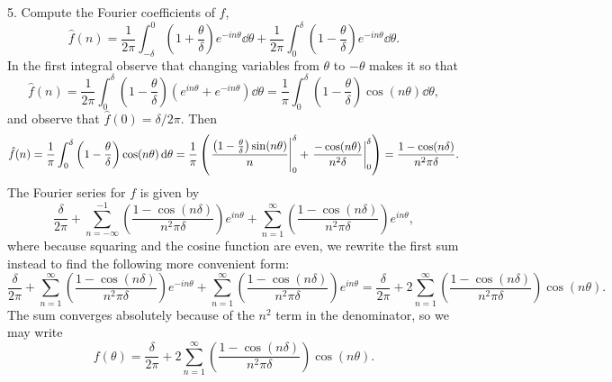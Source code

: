 \documentclass[11pt]{article}
\newcommand{\br}[1]{\left(#1\right)}
\begin{document}
5. Compute the Fourier coefficients of $f$, \[\hat{f}(n) = \frac{1}{2\pi}\int_{-\delta}^{0}\br{1+\frac{\theta}{\delta}}e^{-in\theta}\dd{\theta} + \frac{1}{2\pi}\int_{0}^{\delta}\br{1-\frac{\theta}{\delta}}e^{-in\theta}\dd{\theta}.\] In the first integral observe that changing variables from $\theta$ to $-\theta$ makes it so that \[\hat{f}(n) = \frac{1}{2\pi}\int_0^{\delta}\br{1-\frac{\theta}{\delta}}\br{e^{in\theta} + e^{-in\theta}}\dd{\theta} = \frac{1}{\pi}\int_0^{\delta}\br{1-\frac{\theta}{\delta}}\cos(n\theta)\dd{\theta},\] and observe that $\hat{f}(0) = \delta/2\pi$. Then \[\hat{f}(n) = \frac{1}{\pi}\int_0^{\delta}\br{1-\frac{\theta}{\delta}}\cos(n\theta)\dd{\theta} = \frac{1}{\pi} \br{ \eval{\frac{\br{1-\frac{\theta}{\delta}}\sin(n\theta)}{n}}_0^{\delta} + \eval{\frac{-\cos(n\theta)}{n^2\delta}}_0^{\delta} } = \frac{1-\cos(n\delta)}{n^2\pi\delta}.\] The Fourier series for $f$ is given by \[\frac{\delta}{2\pi} + \sum_{n=-\infty}^{-1} \br{\frac{1-\cos(n\delta)}{n^2\pi\delta}}e^{in\theta} + \sum_{n=1}^{\infty} \br{\frac{1-\cos(n\delta)}{n^2\pi\delta}}e^{in\theta},\] where because squaring and the cosine function are even, we rewrite the first sum instead to find the following more convenient form: \[\frac{\delta}{2\pi} + \sum_{n=1}^{\infty} \br{\frac{1-\cos(n\delta)}{n^2\pi\delta}}e^{-in\theta} + \sum_{n=1}^{\infty} \br{\frac{1-\cos(n\delta)}{n^2\pi\delta}}e^{in\theta} = \frac{\delta}{2\pi} + 2\sum_{n=1}^{\infty} \br{\frac{1-\cos(n\delta)}{n^2\pi\delta}}\cos(n\theta).\] The sum converges absolutely because of the $n^2$ term in the denominator, so we may write \[f(\theta) = \frac{\delta}{2\pi} + 2\sum_{n=1}^{\infty} \br{\frac{1-\cos(n\delta)}{n^2\pi\delta}}\cos(n\theta).\]
\end{document}
